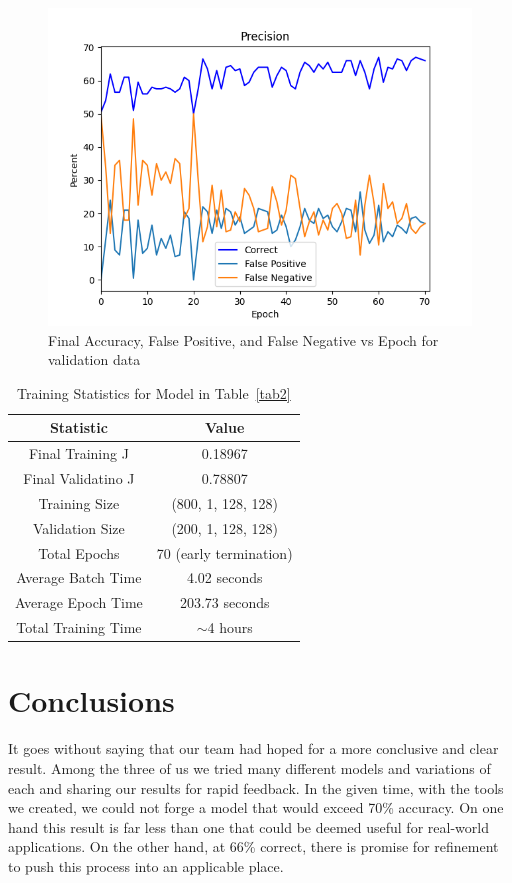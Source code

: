 \documentclass[conference]{IEEEtran}
\begin{document}
\begin{figure}[htbp]
\centerline{\includegraphics[width=.5\textwidth]{images/exp3/test_model_validation.png}}
\caption{Final Accuracy, False Positive, and False Negative vs Epoch for validation data}
\label{final_valid_acc}
\end{figure}

\begin{table}[htbp]
\caption{Training Statistics for Model in Table~\ref{tab2}}
\begin{center}
\begin{tabular}{|c|c|}
\hline
\textbf{Statistic}&\textbf{Value}\\
\cline{2-2} 
\hline
Final Training J & 0.18967 \\
Final Validatino J & 0.78807 \\
Training Size & (800, 1, 128, 128) \\
Validation Size & (200, 1, 128, 128) \\
Total Epochs & 70 (early termination) \\
Average Batch Time & 4.02 seconds \\
Average Epoch Time & 203.73 seconds \\
Total Training Time & $\sim$4 hours \\
\hline
\end{tabular}
\label{stats1}
\end{center}
\end{table}

\section{Conclusions}

It goes without saying that our team had hoped for a more conclusive and clear result. Among the three of us we tried many different models and variations of each and sharing our results for rapid feedback. In the given time, with the tools we created, we could not forge a model that would exceed 70\% accuracy. On one hand this result is far less than one that could be deemed useful for real-world applications. On the other hand, at 66\% correct, there is promise for refinement to push this process into an applicable place.
\end{document}
